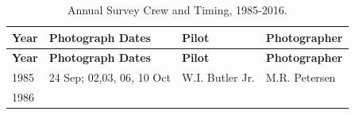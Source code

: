 \documentclass[]{article}
\begin{document}
\normalsize

\begin{longtable}[]{@{}llll@{}}
\caption{Annual Survey Crew and Timing, 1985-2016.}\tabularnewline
\toprule
\begin{minipage}[b]{0.12\columnwidth}\raggedright\strut
\textbf{Year}\strut
\end{minipage} & \begin{minipage}[b]{0.38\columnwidth}\raggedright\strut
\textbf{Photograph Dates}\strut
\end{minipage} & \begin{minipage}[b]{0.18\columnwidth}\raggedright\strut
\textbf{Pilot}\strut
\end{minipage} & \begin{minipage}[b]{0.20\columnwidth}\raggedright\strut
\textbf{Photographer}\strut
\end{minipage}\tabularnewline
\midrule
\endfirsthead
\toprule
\begin{minipage}[b]{0.12\columnwidth}\raggedright\strut
\textbf{Year}\strut
\end{minipage} & \begin{minipage}[b]{0.38\columnwidth}\raggedright\strut
\textbf{Photograph Dates}\strut
\end{minipage} & \begin{minipage}[b]{0.18\columnwidth}\raggedright\strut
\textbf{Pilot}\strut
\end{minipage} & \begin{minipage}[b]{0.20\columnwidth}\raggedright\strut
\textbf{Photographer}\strut
\end{minipage}\tabularnewline
\midrule
\endhead
\begin{minipage}[t]{0.12\columnwidth}\raggedright\strut
1985\strut
\end{minipage} & \begin{minipage}[t]{0.38\columnwidth}\raggedright\strut
24 Sep; 02,03, 06, 10 Oct\strut
\end{minipage} & \begin{minipage}[t]{0.18\columnwidth}\raggedright\strut
W.I. Butler Jr.\strut
\end{minipage} & \begin{minipage}[t]{0.20\columnwidth}\raggedright\strut
M.R. Petersen\strut
\end{minipage}\tabularnewline
\begin{minipage}[t]{0.12\columnwidth}\raggedright\strut
1986\strut
\end{minipage} & \begin{minipage}[t]{0.38\columnwidth}\raggedright\strut

\end{minipage}
\end{longtable}
\end{document}
